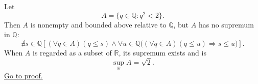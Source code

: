 \begin{lemma}
\label{lem:rational-gap-suprema}
Let
\[
  A=\{q\in\mathbb{Q}:q^2<2\}.
\]
Then $A$ is nonempty and bounded above relative to $\mathbb{Q}$, but $A$ has
no supremum in $\mathbb{Q}$:
\[
  \nexists s\in\mathbb{Q}\left[
  (\forall q\in A)(q\leq s)
  \land
  \forall u\in\mathbb{Q}
  \bigl((\forall q\in A)(q\leq u)\Longrightarrow s\leq u\bigr)
  \right].
\]
When $A$ is regarded as a subset of $\mathbb{R}$, its supremum exists and is
\[
  \sup_{\mathbb{R}}A=\sqrt{2}.
\]
\hyperref[prf:rational-gap-suprema]{Go to proof.}
\end{lemma}
